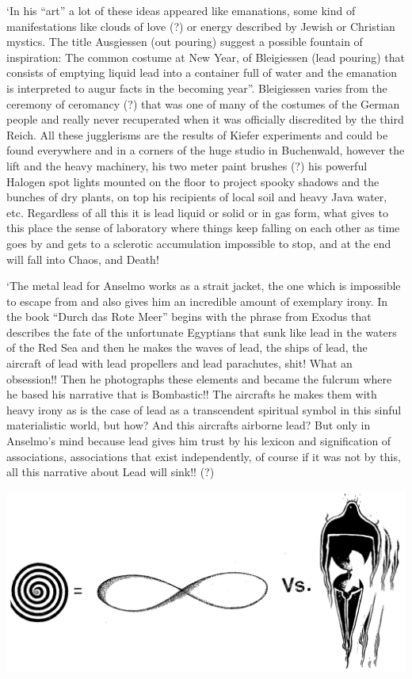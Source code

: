 \documentclass[smalldemyvopaper,11pt,twoside,onecolumn,openright,extrafontsizes]{memoir}
\begin{document}
‘In his “art” a lot of these ideas appeared like emanations, some kind of manifestations like clouds of love (?) or energy described by Jewish or Christian mystics. The title Ausgiessen (out pouring) suggest a possible fountain of inspiration: The common costume at New Year, of Bleigiessen (lead pouring) that consists of emptying liquid lead into a container full of water and the emanation is interpreted to augur facts in the becoming year”. Bleigiessen varies from the ceremony of ceromancy (?) that was one of many of the costumes of the German people and really never recuperated when it was officially discredited by the third Reich. All these jugglerisms are the results of Kiefer experiments and could be found everywhere and in a corners of the huge studio in Buchenwald, however the lift and the heavy machinery, his two meter paint brushes (?) his powerful Halogen spot lights mounted on the floor to project spooky shadows and the bunches of dry plants, on top his recipients of local soil and heavy Java water, etc. Regardless of all this it is lead liquid or solid or in gas form, what gives to this place the sense of laboratory where things keep falling on each other as time goes by and gets to a sclerotic accumulation impossible to stop, and at the end will fall into Chaos, and Death!

‘The metal lead for Anselmo works as a strait jacket, the one which is impossible to escape from and also gives him an incredible amount of exemplary irony. In the book “Durch das Rote Meer” begins with the phrase from Exodus that describes the fate of the unfortunate Egyptians that sunk like lead in the waters of the Red Sea and then he makes the waves of lead, the ships of lead, the aircraft of lead with lead propellers and lead parachutes, shit! What an obsession!! Then he photographs these elements and became the fulcrum where he based his narrative that is Bombastic!! The aircrafts he makes them with heavy irony as is the case of lead as a transcendent spiritual symbol in this sinful materialistic world, but how? And this aircrafts airborne lead? But only in Anselmo’s mind because lead gives him trust by his lexicon and signification of associations, associations that exist independently, of course if it was not by this, all this narrative about Lead will sink!! (?)

\begin{center}
    \includegraphics[width=\textwidth]{./images/inf}
\end{center}
\end{document}
